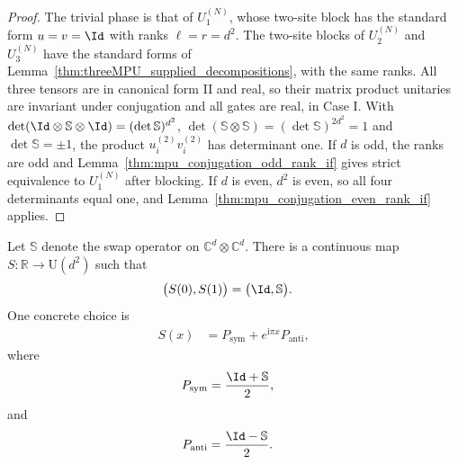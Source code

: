 \begin{proof}
    \leanok
    The trivial phase is that of $U_1^{(N)}$, whose two-site block has the
    standard form $u=v=\Id$ with ranks $\ell=r=d^2$. The two-site blocks of
    $U_2^{(N)}$ and $U_3^{(N)}$ have the standard forms of
    Lemma~\ref{thm:threeMPU_supplied_decompositions}, with the same ranks.
    All three tensors are in canonical form II and real, so their matrix product
    unitaries are invariant under conjugation and all gates are real, in Case I.
    With $\det(\Id\otimes\mathbb S\otimes\Id)=(\det\mathbb S)^{d^2}$,
    $\det(\mathbb S\otimes\mathbb S)=(\det\mathbb S)^{2d^2}=1$ and
    $\det\mathbb S=\pm1$, the product $u_i^{(2)}v_i^{(2)}$ has determinant one.
    If $d$ is odd, the ranks are odd and
    Lemma~\ref{thm:mpu_conjugation_odd_rank_if} gives strict equivalence to
    $U_1^{(N)}$ after blocking. If $d$ is even, $d^2$ is even, so all four
    determinants equal one, and Lemma~\ref{thm:mpu_conjugation_even_rank_if}
    applies.
\end{proof}

\begin{lemma}
    \label{thm:mpu-continuous-unitary-swap-path}
    \leanok
    Let $\mathbb S$ denote the swap operator on
    $\mathbb C^d\otimes\mathbb C^d$. There is a continuous map
    $S\colon\mathbb R\to \mathrm{U}(d^2)$ such that
    \begin{align}
        \bigl(S(0),S(1)\bigr) & = \bigl(\Id,\mathbb S\bigr).
    \end{align}
    One concrete choice is
    \begin{align}
        S(x) & = P_{\mathrm{sym}} + e^{\mathrm{i}\pi x}P_{\mathrm{anti}},
    \end{align}
    where
    \begin{align}
        P_{\mathrm{sym}} & = \frac{\Id+\mathbb S}{2},
    \end{align}
    and
    \begin{align}
        P_{\mathrm{anti}} & = \frac{\Id-\mathbb S}{2}.
    \end{align}
\end{lemma}

